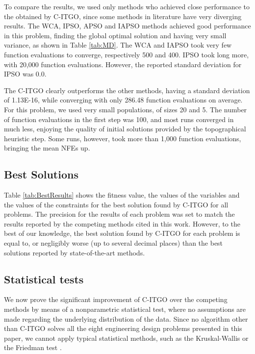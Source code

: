To compare the results, we used only methods who achieved close performance to the obtained by C-ITGO, since some methods in literature have very diverging results. The WCA, IPSO, APSO and IAPSO methods achieved good performance in this problem, finding the global optimal solution and having very small variance, as shown in Table \ref{tab:MD}. The WCA and IAPSO took very few function evaluations to converge, respectively 500 and 400. IPSO took long more, with 20,000 function evaluations. However, the reported standard deviation for IPSO was 0.0.



The C-ITGO clearly outperforms the other methods, having a standard deviation of 1.13E-16, while converging with only 286.48 function evaluations on average. For this problem, we used very small populations, of sizes 20 and 5. The number of function evaluations in the first step was 100, and most runs converged in much less, enjoying the quality of initial solutions provided by the topographical heuristic step. Some runs, however, took more than 1,000 function evaluations, bringing the mean NFEs up.



\subsection{Best Solutions}

Table \ref{tab:BestResults} shows the fitness value, the values of the variables and the values of the constraints for the best solution found by C-ITGO for all problems. The precision for the results of each problem was set to match the results reported by the competing methods cited in this work. However, to the best of our knowledge, the best solution found by C-ITGO for each problem is equal to, or negligibly worse (up to several decimal places) than the best solutions reported by state-of-the-art methods.




\subsection{Statistical tests}

We now prove the significant improvement of C-ITGO over the competing methods by means of a nonparametric statistical test, where no assumptions are made regarding the underlying distribution of the data. Since no algorithm other than C-ITGO solves all the eight engineering design problems presented in this paper, we cannot apply typical statistical methods, such as the Kruskal-Wallis \citep{Kruskal} or the Friedman test \citep{Friedman}.

